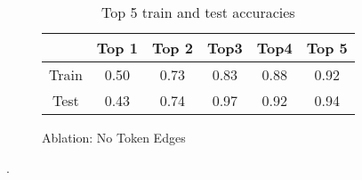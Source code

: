 \begin{table}
  \begin{subfigure}{\linewidth}
    \centering
    \begin{tabular}{c|ccccc}
      & Top 1 & Top 2 & Top3 & Top4 & Top 5 \\
      \hline
      Train & 0.50 & 0.73 & 0.83 & 0.88 & 0.92 \\
      Test & 0.43 & 0.74 & 0.97 & 0.92 & 0.94
      \end{tabular}
      \caption{Ablation: No Token Edges}\label{tab:results:token}
  \end{subfigure}
  \caption{Top 5 train and test accuracies}
  \label{tab:results}.
\end{table}